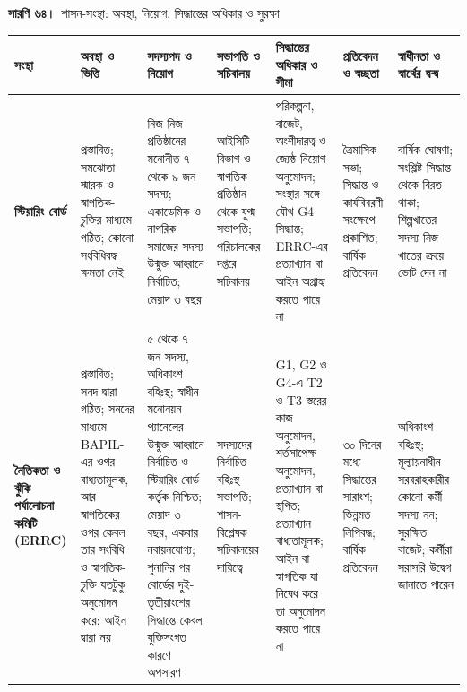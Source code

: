 \documentclass[border=10pt]{standalone}
\begin{document}
\begin{minipage}{22cm}
{\large\bfseries সারণি ৬৪।}\ {\large শাসন-সংস্থা: অবস্থা, নিয়োগ, সিদ্ধান্তের অধিকার ও সুরক্ষা}\par\vspace{7pt}
\small
{}
\begin{tabularx}{\linewidth}{@{}>{\hsize=1.031\hsize\raggedright\arraybackslash}X>{\hsize=0.977\hsize\raggedright\arraybackslash}X>{\hsize=1.194\hsize\raggedright\arraybackslash}X>{\hsize=0.705\hsize\raggedright\arraybackslash}X>{\hsize=1.194\hsize\raggedright\arraybackslash}X>{\hsize=0.868\hsize\raggedright\arraybackslash}X>{\hsize=1.031\hsize\raggedright\arraybackslash}X@{}}
\arrayrulecolor{bapilrule}\toprule
\rowcolor{white}\textbf{সংস্থা} & \textbf{অবস্থা ও ভিত্তি} & \textbf{সদস্যপদ ও নিয়োগ} & \textbf{সভাপতি ও সচিবালয়} & \textbf{সিদ্ধান্তের অধিকার ও সীমা} & \textbf{প্রতিবেদন ও স্বচ্ছতা} & \textbf{স্বাধীনতা ও স্বার্থের দ্বন্দ্ব} \\
\midrule
\textbf{স্টিয়ারিং বোর্ড} & প্রস্তাবিত; সমঝোতা স্মারক ও স্বাগতিক-চুক্তির মাধ্যমে গঠিত; কোনো সংবিধিবদ্ধ ক্ষমতা নেই & নিজ নিজ প্রতিষ্ঠানের মনোনীত ৭ থেকে ৯ জন সদস্য; একাডেমিক ও নাগরিক সমাজের সদস্য উন্মুক্ত আহ্বানে নির্বাচিত; মেয়াদ ৩ বছর & আইসিটি বিভাগ ও স্বাগতিক প্রতিষ্ঠান থেকে যুগ্ম সভাপতি; পরিচালকের দপ্তরে সচিবালয় & পরিকল্পনা, বাজেট, অংশীদারত্ব ও জ্যেষ্ঠ নিয়োগ অনুমোদন; সংস্থার সঙ্গে যৌথ G4 সিদ্ধান্ত; ERRC-এর প্রত্যাখ্যান বা আইন অগ্রাহ্য করতে পারে না & ত্রৈমাসিক সভা; সিদ্ধান্ত ও কার্যবিবরণী সংক্ষেপে প্রকাশিত; বার্ষিক প্রতিবেদন & বার্ষিক ঘোষণা; সংশ্লিষ্ট সিদ্ধান্ত থেকে বিরত থাকা; শিল্পখাতের সদস্য নিজ খাতের ক্রয়ে ভোট দেন না \\
\textbf{নৈতিকতা ও ঝুঁকি পর্যালোচনা কমিটি (ERRC)} & প্রস্তাবিত; সনদ দ্বারা গঠিত; সনদের মাধ্যমে BAPIL-এর ওপর বাধ্যতামূলক, আর স্বাগতিকের ওপর কেবল তার সংবিধি ও স্বাগতিক-চুক্তি যতটুকু অনুমোদন করে; আইন দ্বারা নয় & ৫ থেকে ৭ জন সদস্য, অধিকাংশ বহিঃস্থ; স্বাধীন মনোনয়ন প্যানেলের উন্মুক্ত আহ্বানে নির্বাচিত ও স্টিয়ারিং বোর্ড কর্তৃক নিশ্চিত; মেয়াদ ৩ বছর, একবার নবায়নযোগ্য; শুনানির পর বোর্ডের দুই-তৃতীয়াংশের সিদ্ধান্তে কেবল যুক্তিসংগত কারণে অপসারণ & সদস্যদের নির্বাচিত বহিঃস্থ সভাপতি; শাসন-বিশ্লেষক সচিবালয়ের দায়িত্বে & G1, G2 ও G4-এ T2 ও T3 স্তরের কাজ অনুমোদন, শর্তসাপেক্ষ অনুমোদন, প্রত্যাখ্যান বা স্থগিত; প্রত্যাখ্যান বাধ্যতামূলক; আইন বা স্বাগতিক যা নিষেধ করে তা অনুমোদন করতে পারে না & ৩০ দিনের মধ্যে সিদ্ধান্তের সারাংশ; ভিন্নমত লিপিবদ্ধ; বার্ষিক প্রতিবেদন & অধিকাংশ বহিঃস্থ; মূল্যায়নাধীন সরবরাহকারীর কোনো কর্মী সদস্য নন; সুরক্ষিত বাজেট; কর্মীরা সরাসরি উদ্বেগ জানাতে পারেন \\

\end{tabularx}
\end{minipage}
\end{document}
